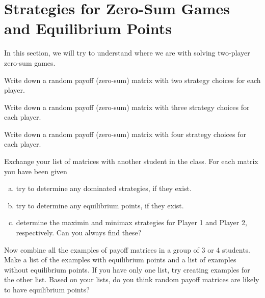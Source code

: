 

\section{Strategies for Zero-Sum Games and Equilibrium Points}



In this section, we will try to understand where we are with solving two-player zero-sum games. %

\begin{xca}\label{E:random2}
Write down a random payoff (zero-sum) matrix with two strategy choices for each player.
\end{xca}
\begin{xca}\label{E:random3}
Write down a random payoff (zero-sum) matrix with three strategy choices for each player.
\end{xca}
\begin{xca}\label{E:random4}
Write down a random payoff (zero-sum) matrix with four strategy choices for each player.
\end{xca}
\begin{xca}\label{E:exchangematrices}
Exchange your list of matrices with another student in the class. For each matrix you have been given


\begin{enumerate}[(a)]
\item try to determine any dominated strategies, if they exist.
\item try to determine any equilibrium points, if they exist.
\item determine the maximin and minimax strategies for Player 1 and Player 2, respectively. Can you always find these?
 
\end{enumerate}
\end{xca}

\begin{xca}\label{E:makelists}
Now combine all the examples of payoff matrices in a group of 3 or 4 students. Make a list of the examples with equilibrium points and a list of examples without equilibrium points. If you have only one list, try creating examples for the other list. Based on your lists, do you think random payoff matrices are likely to have equilibrium points? 
\end{xca}



